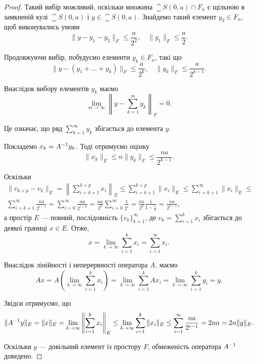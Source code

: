 \begin{proof}
Такий вибір можливий, оскільки множина $\closure S(0, a) \cap F_n$ є
щільною в замкненій кулі $\closure S(0, a)$ і $y \in \closure S(0, a)$. Знайдемо
такий елемент $y_2 \in F_n$, щоб виконувались умови
\begin{equation*}
    \|y - y_1 - y_2\|_F \le \frac{a}{2^2}, \quad \|y_1\|_F \le \frac{a}{2}.
\end{equation*}

Продовжуючи вибір, побудуємо елементи $y_k \in F_n$, такі що
\begin{equation*}
    \|y - (y_1 + \dots + y_k)\|_F \le \frac{a}{2^k}, \quad \|y_k\|_F \le \frac{a}{2^{k - 1}}.
\end{equation*}

Внаслідок вибору елементів $y_k$ маємо
\begin{equation*}
    \lim_{m \to \infty} \left\| y - \sum_{k = 1}^m y_k \right\|_F = 0.
\end{equation*}

Це означає, що ряд $\sum_{k = 1}^\infty y_k$ збігається до елемента $y$.

Покладемо $x_k = A^{-1} y_k$. Тоді отримуємо оцінку
\begin{equation*}
    \|x_k\|_E \le n \|y_k\|_F \le \frac{n a}{2^{k - 1}}.
\end{equation*}

Оскільки
\begin{multline*}
    \|v_{k + p} - v_k\|_E =
    \left\| \sum_{i = k + 1}^{k + p} x_i \right\|_E \le
    \sum_{i = k + 1}^{k + p} \|x_i\|_E \le
    \sum_{i = k + 1}^\infty \|x_i\|_E \le \\
    \sum_{i = k + 1}^\infty \frac{n a}{2^{i - 1}} =
    \sum_{i = 0}^\infty \frac{n a}{2^{i + k}} =
    \frac{n a}{2^k} \sum_{i = 0}^\infty \frac{1}{2^i} =
    \frac{n a}{2^k} \frac{1}{1 - \tfrac{1}{2}} =
    \frac{n a}{2^{k - 1}},
\end{multline*}
а простір $E$ --- повний, послідовність $\{v_k\}_{k = 1}^\infty$, де
$v_k = \sum_{i = 1}^k x_i$ збігається до деякої границі $x \in E$. Отже,
\begin{equation*}
    x = \lim_{k \to \infty} \sum_{i = 1}^k x_i = \sum_{i = 1}^\infty x_i.
\end{equation*}

Внаслідок лінійності і неперервності оператора $A$, маємо
\begin{equation*}
    A x =
    A \left( \lim_{k \to \infty} \sum_{i = 1}^k x_i \right) =
    \lim_{k \to \infty} \sum_{i = 1}^k A x_i =
    \lim_{k \to \infty} \sum_{i = 1}^k y_i = y.
\end{equation*}

Звідси отримуємо, що
\begin{equation*}
    \|A^{-1} y\|_E = \|x\|_E =
    \lim_{k \to \infty} \left\| \sum_{i = 1}^k x_i \right\|_E \le
    \lim_{k \to \infty} \sum_{i = 1}^k \|x_i\|_E \le
    \sum_{i = 1}^\infty \frac{n a}{2^{i - 1}} =
    2 n a = 2 n \|y\|_E.
\end{equation*}
 
Оскільки $y$ --- довільний елемент із простору $F$,
обмеженість оператора $A^{-1}$ доведено. 
\end{proof}

